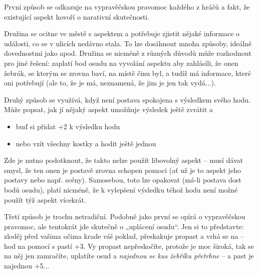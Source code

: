 \documentclass[../main.tex]{subfiles}
\begin{document}
První způsob se odkazuje na vypravěčskou pravomoc každého z hráčů a fakt, že existující aspekt hovoří o narativní skutečnosti. 

\begin{příklad}
Družina se ocitne ve městě s aspektem  a potřebuje zjistit nějaké informace o události, co se v ulicích nedávno stala. To lze dosáhnout mnoha způsoby, ideálně dovednostmi jako  apod. Družina se nicméně z různých důvodů \sidenotemark  může rozhodnout pro jiné řešení: zaplatí bod osudu na vyvolání aspektu  aby zahlásili, že onen žebrák, se kterým se zrovna baví, na místě činu byl, a tudíž má informace, které oni potřebují (ale to, že je má, neznamená, že jim je jen tak vydá...).

\end{příklad}
Druhý způsob se využívá, když není postava spokojena s výsledkem svého hodu. Může popsat, jak jí nějaký aspekt umožňuje výsledek ještě zvrátit a

\begin{pravidlo}
\begin{itemize}
\item buď si přidat +2 k výsledku hodu
\item nebo vzít všechny kostky a hodit ještě jednou
\end{itemize}
\end{pravidlo}

Zde je nutno podotknout, že takto nelze použít libovolný aspekt – musí dávat smysl, že ten onen je postavě zrovna schopen pomoci (ať už je to aspekt jeho postavy nebo např. scény). Samosebou, toto lze opakovat (má-li postava dost bodů osudu), platí nicméně, že k vylepšení výsledku téhož hodu není možné použít týž aspekt vícekrát.

Třetí způsob je trochu netradiční. Podobně jako první se opírá o vypravěčskou pravomoc, ale tentokrát jde skutečně o „uplácení osudu“. Jen si to představte: zloděj před vašima očima krade váš poklad, přeskakuje propast a vrhá se na  – hod na  pomocí  s pastí +3. Vy propast nepřeskočíte, protože je moc široká, tak se na něj jen zamračíte, uplatíte osud a \emph{najednou se kus žebříku přetrhne} – a past je najednou +5... 
\end{document}
